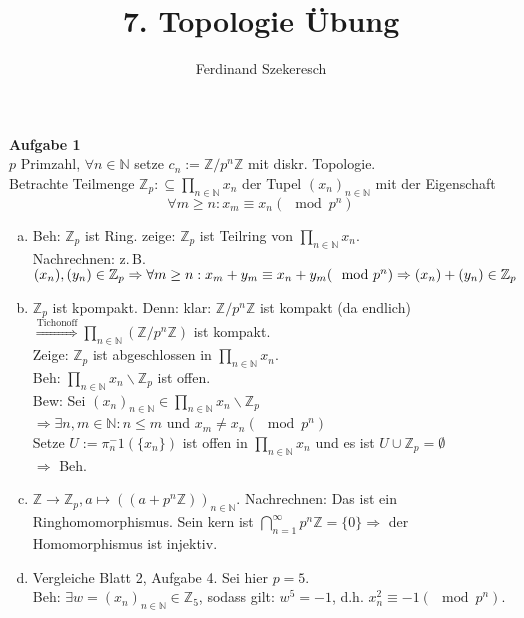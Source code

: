 \documentclass{article}
\title{7. Topologie Übung}
\author{Ferdinand Szekeresch}
\begin{document}
\maketitle

\textbf{Aufgabe 1}\\
$p$ Primzahl, $\forall n\in\mathbb{N}$ setze $c_n:=\mathbb{Z}/p^n\mathbb{Z}$ mit diskr. Topologie.\\
Betrachte Teilmenge $\mathbb{Z}_p:\subseteq\prod\limits_{n\in\mathbb{N}}x_n$ der Tupel $(x_n)_{n\in\mathbb{N}}$ mit der Eigenschaft
$$\forall m\geq n:x_m\equiv x_n(\mod p^n)$$
\begin{enumerate}[(a)]
\item Beh: $\mathbb{Z}_p$ ist Ring. zeige: $\mathbb{Z}_p$ ist Teilring von $\prod\limits_{n\in\mathbb{N}}x_n$.\\
Nachrechnen: z.\,B. $(x_n),(y_n)\in\mathbb{Z}_p\\
\Rightarrow\forall m\geq n: x_m+y_m\equiv x_n+y_m(\mod p^n)\Rightarrow (x_n)+(y_n)\in\mathbb{Z}_p$
\item $\mathbb{Z}_p$ ist kpompakt. Denn: klar: $\mathbb{Z}/p^n\mathbb{Z}$ ist kompakt (da endlich)\\
$\stackrel{\text{Tichonoff}}{\Longrightarrow} \prod\limits_{n\in\mathbb{N}}(\mathbb{Z}/p^n\mathbb{Z})$ ist kompakt.\\
Zeige: $\mathbb{Z}_p$ ist abgeschlossen in $\prod\limits_{n\in\mathbb{N}}x_n$.\\
Beh: $\prod\limits_{n\in\mathbb{N}}x_n\backslash\mathbb{Z}_p$ ist offen.\\
Bew: Sei $(x_n)_{n\in\mathbb{N}}\in\prod\limits_{n\in\mathbb{N}}x_n\backslash\mathbb{Z}_p$\\
$\Rightarrow\exists n,m\in\mathbb{N}: n\leq m$ und $x_m\neq x_n(\mod p^n)$\\
Setze $U:=\pi_n^-1\left(\{x_n\}\right)$ ist offen in $\prod\limits_{n\in\mathbb{N}}x_n$ und es ist $U\cup\mathbb{Z}_p=\emptyset$\\
$\Rightarrow$ Beh.
\item $\mathbb{Z}\rightarrow\mathbb{Z}_p, a\mapsto\left((a+p^n\mathbb{Z})\right)_{n\in\mathbb{N}}$. Nachrechnen: Das ist ein Ringhomomorphismus.
Sein kern ist $\bigcap\limits_{n=1}^{\infty}p^n\mathbb{Z}=\{0\} \Rightarrow$ der Homomorphismus ist injektiv.
\item Vergleiche Blatt 2, Aufgabe 4. Sei hier $p=5$.\\
Beh: $\exists w=(x_n)_{n\in\mathbb{N}}\in\mathbb{Z}_5$, sodass gilt: $w^5=-1$, d.h. $x_n^2\equiv-1(\mod p^n)$.\\

\end{enumerate}
\end{document}
